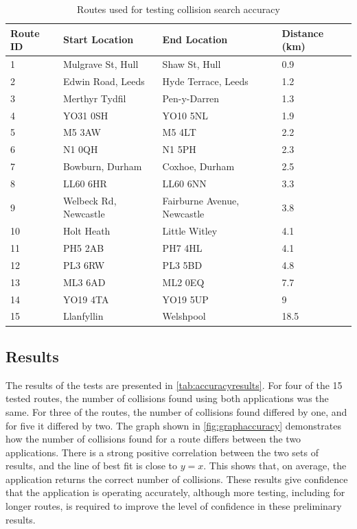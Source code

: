 \documentclass[authoryearcitations]{UoYCSproject}
\begin{document}
\begin{table}
	\center
	\caption{Routes used for testing collision search accuracy}
	\label{tab:accuracyroutes}
	\begin{tabular}{| l | l | l | l |}
	\hline
	\textbf{Route ID} & \textbf{Start Location} & \textbf{End Location} & \textbf{Distance (km)}  \\ \hline
	1 & Mulgrave St, Hull & Shaw St, Hull & 0.9  \\ \hline 	
	2 & Edwin Road, Leeds & Hyde Terrace, Leeds & 1.2  \\ \hline 
	3 & Merthyr Tydfil & Pen-y-Darren & 1.3  \\ \hline 
	4 & YO31 0SH & YO10 5NL & 1.9 \\ \hline
	5 & M5 3AW & M5 4LT & 2.2  \\ \hline 
	6 & N1 0QH & N1 5PH & 2.3 \\ \hline
	7 & Bowburn, Durham & Coxhoe, Durham & 2.5  \\ \hline 
	8 & LL60 6HR & LL60 6NN & 3.3  \\ \hline 
	9 & Welbeck Rd, Newcastle & Fairburne Avenue, Newcastle & 3.8  \\ \hline 
	10 & Holt Heath & Little Witley & 4.1 \\ \hline
	11 & PH5 2AB & PH7 4HL & 4.1 \\ \hline
	12 & PL3 6RW & PL3 5BD & 4.8  \\ \hline 
	13 & ML3 6AD & ML2 0EQ & 7.7  \\ \hline 
	14 & YO19 4TA & YO19 5UP & 9  \\ \hline 
	15 & Llanfyllin & Welshpool & 18.5  \\ \hline 
	\end{tabular}
\end{table}

\subsection{Results}

The results of the tests are presented in \autoref{tab:accuracyresults}. For four of the 15 tested routes, the number of collisions found using both applications was the same. For three of the routes, the number of collisions found differed by one, and for five it differed by two. The graph shown in \autoref{fig:graphaccuracy} demonstrates how the number of collisions found for a route differs between the two applications. There is a strong positive correlation between the two sets of results, and the line of best fit is close to $y=x$. This shows that, on average, the application returns the correct number of collisions. These results give confidence that the application is operating accurately, although more testing, including for longer routes, is required to improve the level of confidence in these preliminary results.
\end{document}
